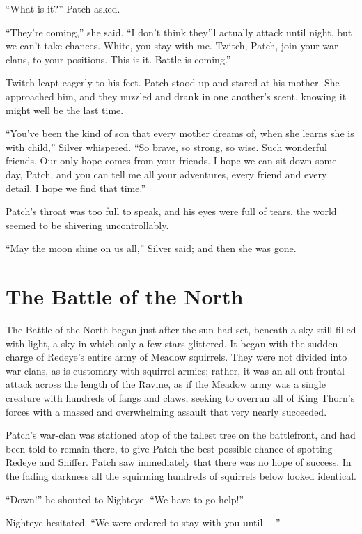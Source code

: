 \documentclass[ebook,oneside,openany,12pt]{memoir}
\begin{document}
“What is it?” Patch asked.

“They’re coming,” she said. “I don’t think they’ll actually attack
until night, but we can’t take chances. White, you stay with
me. Twitch, Patch, join your war-clans, to your positions. This is
it. Battle is coming.”

Twitch leapt eagerly to his feet. Patch stood up and stared at his
mother. She approached him, and they nuzzled and drank in one
another’s scent, knowing it might well be the last time.

“You’ve been the kind of son that every mother dreams of, when she
learns she is with child,” Silver whispered. “So brave, so strong, so
wise. Such wonderful friends. Our only hope comes from your friends. I
hope we can sit down some day, Patch, and you can tell me all your
adventures, every friend and every detail. I hope we find that time.”

Patch’s throat was too full to speak, and his eyes were full of tears,
the world seemed to be shivering uncontrollably.

“May the moon shine on us all,” Silver said; and then she was gone.


\section{The Battle of the North}

The Battle of the North began just after the sun had set, beneath a
sky still filled with light, a sky in which only a few stars
glittered. It began with the sudden charge of Redeye’s entire army of
Meadow squirrels. They were not divided into war-clans, as is
customary with squirrel armies; rather, it was an all-out frontal
attack across the length of the Ravine, as if the Meadow army was a
single creature with hundreds of fangs and claws, seeking to overrun
all of King Thorn’s forces with a massed and overwhelming assault that
very nearly succeeded.

Patch’s war-clan was stationed atop of the tallest tree on the
battlefront, and had been told to remain there, to give Patch the best
possible chance of spotting Redeye and Sniffer. Patch saw immediately
that there was no hope of success. In the fading darkness all the
squirming hundreds of squirrels below looked identical.

“Down!” he shouted to Nighteye. “We have to go help!”

Nighteye hesitated. “We were ordered to stay with you until —”
\end{document}
